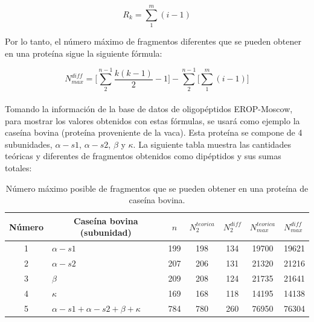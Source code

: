 \begin{equation}
R_{k}=\sum_{1}^{m}(i-1)
\end{equation}

Por lo tanto, el número máximo de fragmentos diferentes que se pueden obtener en una proteína sigue la siguiente fórmula:

\begin{equation}
N_{max}^{diff}=\Bigg[\sum_{2}^{n-1} \frac{k(k-1)}{2}-1\Bigg]- \sum_{2}^{n-1}\Bigg[\sum_{1}^{m}(i-1)\Bigg]
\end{equation}
\\
Tomando la información de la base de datos de oligopéptidos EROP-Moscow, para mostrar los valores obtenidos con estas fórmulas, se usará como ejemplo la caseína bovina (proteína proveniente de la vaca). Esta proteína se compone de 4 subunidades, $\alpha - s1$, $\alpha -s2$, $\beta$ y $\kappa$. La siguiente tabla muestra las cantidades teóricas y diferentes de fragmentos obtenidos como dipéptidos y sus sumas totales:

\begin{table}[H]
\centering
\label{my-label4}
\begin{tabular}{|c|l|c|c|c|c|c|}
\hline
Número & \multicolumn{1}{c|}{Caseína bovina (subunidad)} & $n$ & $N_{2}^{teorica}$ & \multicolumn{1}{l|}{$N_{2}^{diff}$} & \multicolumn{1}{l|}{$N_{max}^{teorica}$} & \multicolumn{1}{l|}{$N_{max}^{diff}$} \\ \hline
1      & $\alpha - s1$                                   & 199 & 198               & 134                                 & 19700                                     & 19621                                  \\
2      & $\alpha - s2$                                   & 207 & 206               & 131                                 & 21320                                     & 21216                                  \\
3      & $\beta$                                         & 209 & 208               & 124                                 & 21735                                     & 21641                                  \\
4      & $\kappa$                                        & 169 & 168               & 118                                 & 14195                                     & 14138                                  \\
5      & $\alpha - s1 + \alpha - s2 + \beta + \kappa$    & 784 & 780               & 260                                 & 76950                                     & 76304                                  \\ \hline
\end{tabular}
\caption{Número máximo posible de fragmentos que se pueden obtener en una proteína de caseína bovina.}
\end{table}

